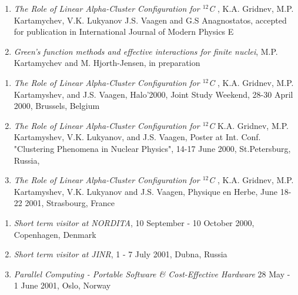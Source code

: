 {\begin{enumerate}
\item
{\em The Role of Linear Alpha-Cluster Configuration for $^{12}$C },
     K.A. Gridnev,
     M.P. Kartamychev,
     V.K. Lukyanov
     J.S. Vaagen
     and G.S Anagnostatos,
     accepted for publication in International Journal of Modern Physics E
\item 
{\em Green's function methods and effective interactions for finite nuclei},
M.P. Kartamychev and M. Hjorth-Jensen, in preparation

\end{enumerate}

\begin{enumerate}

\item
{\em The Role of Linear Alpha-Cluster Configuration for $^{12}$C },
     K.A. Gridnev, 
     M.P. Kartamyshev,
     and J.S. Vaagen,
     Halo'2000, Joint Study Weekend, 28-30 April 2000, Brussels, Belgium

\item
{\em The Role of Linear Alpha-Cluster Configuration for $^{12}$C}
     K.A. Gridnev, 
     M.P. Kartamyshev, 
     V.K. Lukyanov,
     and J.S. Vaagen,
     Poster at Int. Conf. "Clustering Phenomena in Nuclear Physics",
     14-17 June 2000, St.Petersburg, Russia,


\item
{\em The Role of Linear Alpha-Cluster Configuration for $^{12}$C },
     K.A. Gridnev, 
     M.P. Kartamyshev, 
     V.K. Lukyanov 
     and J.S. Vaagen,
     Physique en Herbe, June 18-22 2001, Strasbourg, France


\end{enumerate}

\begin{enumerate}


\item
{\em Short term visitor at NORDITA},
   10 September - 10 October 2000, Copenhagen, Denmark 


\item
{\em Short term visitor at JINR},
      1 - 7 July 2001, Dubna, Russia 

\item
{\em Parallel Computing - Portable Software \& Cost-Effective Hardware}
     28 May - 1 June 2001, Oslo, Norway



\end{enumerate}



}
